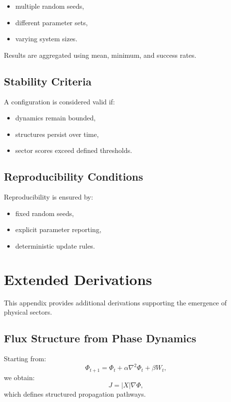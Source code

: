 \documentclass[11pt]{article}
\begin{document}
\begin{itemize}
\item multiple random seeds,
\item different parameter sets,
\item varying system sizes.
\end{itemize}

Results are aggregated using mean, minimum, and success rates.

\subsection{Stability Criteria}

A configuration is considered valid if:

\begin{itemize}
\item dynamics remain bounded,
\item structures persist over time,
\item sector scores exceed defined thresholds.
\end{itemize}

\subsection{Reproducibility Conditions}

Reproducibility is ensured by:

\begin{itemize}
\item fixed random seeds,
\item explicit parameter reporting,
\item deterministic update rules.
\end{itemize}

\section{Extended Derivations}

This appendix provides additional derivations supporting the emergence of physical sectors.

\subsection{Flux Structure from Phase Dynamics}

Starting from:
\[
\Phi_{t+1} = \Phi_t + \alpha \nabla^2 \Phi_t + \beta W_t,
\]
we obtain:
\[
J = |X|\nabla \Phi,
\]
which defines structured propagation pathways.
\end{document}
